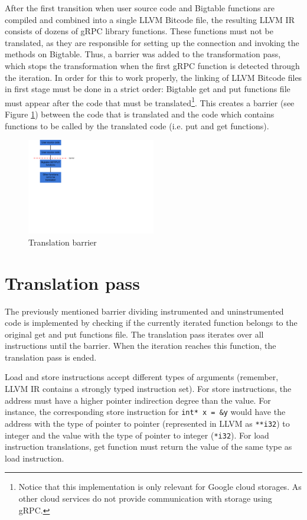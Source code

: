 \documentclass[bsc,frontabs,twoside,singlespacing,parskip,deptreport]{infthesis}     %
\begin{document}
After the first transition when user source code and Bigtable functions are compiled and combined into a single LLVM Bitcode file, the resulting LLVM IR consists of dozens of gRPC library functions. These functions must not be translated, as they are responsible for setting up the connection and invoking the methods on Bigtable. Thus, a barrier was added to the transformation pass, which stops the transformation when the first gRPC function is detected through the iteration. In order for this to work properly, the linking of LLVM Bitcode files in first stage must be done in a strict order: Bigtable get and put functions file must appear after the code that must be translated\footnote{Notice that this implementation is only relevant for Google cloud storages. As other cloud services do not provide communication with storage using gRPC.}. This creates a barrier (see Figure \ref{fig:barrier}) between the code that is translated and the code which contains functions to be called by the translated code (i.e. put and get functions).

\begin{figure}[H]
\centering
\includegraphics[width=0.5\textwidth]{images/barrier}
\caption{Translation barrier}
\label{fig:barrier}
\end{figure}


\section{Translation pass}


The previously mentioned barrier dividing instrumented and uninstrumented code is implemented by checking if the currently iterated function belongs to the original get and put functions file. The translation pass iterates over all instructions until the barrier. When the iteration reaches this function, the translation pass is ended.

Load and store instructions accept different types of arguments (remember, LLVM IR contains a strongly typed instruction set). For store instructions, the address must have a higher pointer indirection degree than the value. For instance, the corresponding store instruction for \texttt{int* x = &y} would have the address with the type of pointer to pointer (represented in LLVM as \texttt{**i32}) to integer and the value with the type of pointer to integer (\texttt{*i32}). For load instruction translations, get function must return the value of the same type as load instruction. 
\end{document}
